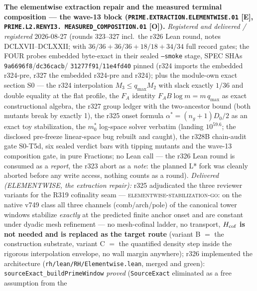 \par\smallskip\noindent\textbf{The elementwise extraction repair
and the measured terminal composition --- the wave-13 block
(\texttt{PRIME.EXTRACTION.\allowbreak ELEMENTWISE.01} [E],
\texttt{PRIME.L2.\allowbreak RENYI3.\allowbreak
MEASURED\_COMPOSITION.01} [O]).}
{\sloppy
\emph{Registered and delivered / registered} 2026-08-27 (rounds
323--327 incl.\ the r326 Lean round, notes DCLXVII--DCLXXII;
 with $36/36 + 36/36 +
18/18 + 34/34$ full record gates; the FOUR probes embedded
byte-exact in their sealed \texttt{--smoke} stage, SPEC SHAs
\texttt{9a6696f8}/\allowbreak\texttt{dc36cacb}/\allowbreak
\texttt{31277f91}/\allowbreak\texttt{11e4fd40} pinned (r324
imports the embedded r324-pre, r327 the embedded r324-pre and
r324); plus the module-own exact section S0 --- the r324
interpolation $M_3 \le q_{\max} M_2$ with slack exactly $1/36$ and
double equality at the flat profile, the $F_A$ identity
$F_A B \log m = m\,q_{\max}$ as exact constructional algebra, the
r327 group ledger with the two-ancestor bound (both mutants break
by exactly 1), the r325 onset formula $\alpha^* = (n_g+1)D_0/2$ as
an exact toy stabilization, the $m_0^*$ log-space solver verbatim
(landing $10^{59.6}$; the disclosed pre-freeze linear-space bug
rebuilt and caught), the r328B chain-audit gate S0-T5d, six sealed
verdict bars with tipping mutants
and the wave-13 composition gate, in pure Fractions; no Lean call
--- the r326 Lean round is consumed as a \emph{report}, the r323
abort as a \emph{note}: the planned L* fork was cleanly aborted
before any write access, nothing counts as a round).
\emph{Delivered (ELEMENTWISE, the extraction repair):} r325
adjudicated the three reviewer variants for the R319 cofinality
seam --- \textsc{elementwise-stabilization-go}: on the native v749
class all three channels (comb/arch/pole) of the canonical tower
windows stabilize \emph{exactly} at the predicted finite anchor
onset and are constant under dyadic mesh refinement --- no
mesh-cofinal ladder, no transport, \textbf{$H_{\rm cof}$ is not
needed and is replaced as the target route} (variant B $=$ the
construction substrate, variant C $=$ the quantified density step
inside the rigorous interpolation envelope, no wall margin
anywhere); r326 implemented the architecture
(\texttt{rh/lean/RH/Elementwise.lean}, merged and green):
\texttt{sourceExact\_buildPrimeWindow} \emph{proved}
(\texttt{SourceExact} eliminated as a free assumption from the
}
